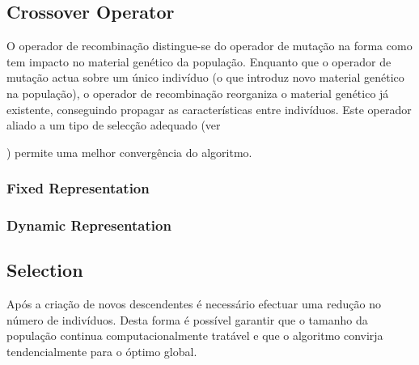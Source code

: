 \documentclass[a4paper]{article}
\begin{document}
\cleardoublepage
\subsection{Crossover Operator}
\indent \indent O operador de recombinação distingue-se do operador de mutação na forma como tem impacto no material genético da população.
Enquanto que o operador de mutação actua sobre um único indivíduo (o que introduz novo material genético na população),
o operador de recombinação reorganiza o material genético já existente, conseguindo propagar as características entre indivíduos.
Este operador aliado a um tipo de selecção adequado (ver ) permite uma melhor convergência
do algoritmo.

\subsubsection{Fixed Representation}
\indent \indent 

\subsubsection{Dynamic Representation}
\indent \indent 

\cleardoublepage
\subsection{Selection}
\indent \indent Após a criação de novos descendentes é necessário efectuar uma redução no número de indivíduos.
Desta forma é possível garantir que o tamanho da população continua computacionalmente tratável e que o algoritmo convirja tendencialmente para o óptimo global.
\end{document}
